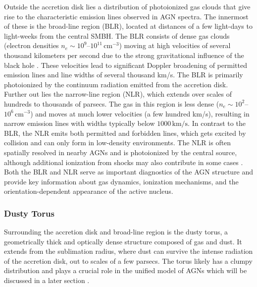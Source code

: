 Outside the accretion disk lies a distribution of photoionized gas clouds that give rise to the characteristic emission lines observed in AGN spectra. The innermost of these is the broad-line region (BLR), located at distances of a few light-days to light-weeks from the central SMBH. The BLR consists of dense gas clouds (electron densities $n_e \sim 10^9$–$10^{11}\,\mathrm{cm}^{-3}$) moving at high velocities of several thousand kilometers per second due to the strong gravitational influence of the black hole \parencite{netzer2013agn}. These velocities lead to significant Doppler broadening of permitted emission lines and line widths of several thousand km/s. The BLR is primarily photoionized by the continuum radiation emitted from the accretion disk.\\
Further out lies the narrow-line region (NLR), which extends over scales of hundreds to thousands of parsecs. The gas in this region is less dense ($n_e \sim 10^2$–$10^6\,\mathrm{cm}^{-3}$) and moves at much lower velocities (a few hundred km/s), resulting in narrow emission lines with widths typically below $1000\,\mathrm{km/s}$. In contrast to the BLR, the NLR emits both permitted and forbidden lines, which gets excited by collision and can only form in low-density environments. The NLR is often spatially resolved in nearby AGNs and is photoionized by the central source, although additional ionization from shocks may also contribute in some cases \parencite{hickox2018obscured,netzer2013agn}.\\
Both the BLR and NLR serve as important diagnostics of the AGN structure and provide key information about gas dynamics, ionization mechanisms, and the orientation-dependent appearance of the active nucleus.



\subsubsection{Dusty Torus}

Surrounding the accretion disk and broad-line region is the dusty torus, a geometrically thick and optically dense structure composed of gas and dust. It extends from the sublimation radius, where dust can survive the intense radiation of the accretion disk, out to scales of a few parsecs. The torus likely has a clumpy distribution and plays a crucial role in the unified model of AGNs which will be discussed in a later section \parencite{netzer2013agn,hickox2018obscured}.




